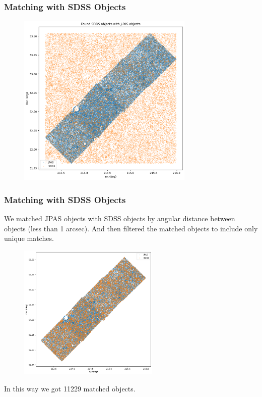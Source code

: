 \documentclass{beamer}
\begin{document}
\begin{frame}
\frametitle{Matching with SDSS Objects}
    \begin{figure}
        \centering
        \includegraphics[width=0.75\textwidth]{../images/SDSS and J-PAS.png}
    \end{figure}
\end{frame}

\begin{frame}
\frametitle{Matching with SDSS Objects}
    We matched JPAS objects with SDSS objects by angular distance between objects (less than 1 arcsec). And then filtered the matched objects to include only unique matches.
    \begin{figure}
        \centering
        \includegraphics[width=0.6\textwidth]{../images/SDSS and J-PAS matched.png}
    \end{figure}
    In this way we got 11229 matched objects.
\end{frame}
\end{document}
